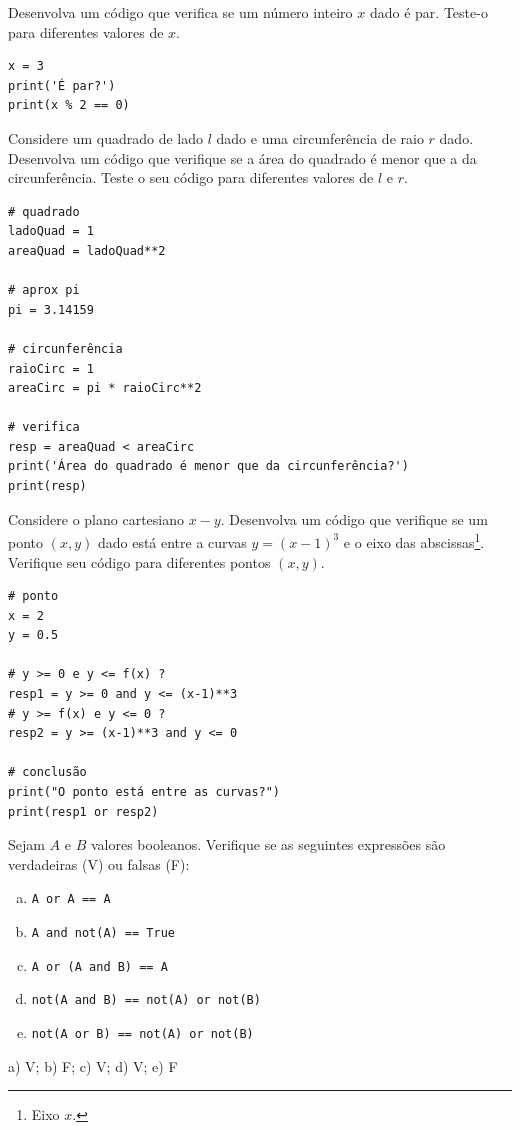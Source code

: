 \begin{exer}
  Desenvolva um código que verifica se um número inteiro $x$ dado é par. Teste-o para diferentes valores de $x$.
\end{exer}
\begin{resp}
\begin{lstlisting}
x = 3
print('É par?')
print(x % 2 == 0)
\end{lstlisting}
\end{resp}

\begin{exer}
  Considere um quadrado de lado $l$ dado e uma circunferência de raio $r$ dado. Desenvolva um código que verifique se a área do quadrado é menor que a da circunferência. Teste o seu código para diferentes valores de $l$ e $r$.
\end{exer}
\begin{resp}
\begin{lstlisting}
# quadrado
ladoQuad = 1
areaQuad = ladoQuad**2

# aprox pi
pi = 3.14159

# circunferência
raioCirc = 1
areaCirc = pi * raioCirc**2

# verifica
resp = areaQuad < areaCirc
print('Área do quadrado é menor que da circunferência?')
print(resp)
\end{lstlisting}
\end{resp}

\begin{exer}
  Considere o plano cartesiano $x-y$. Desenvolva um código que verifique se um ponto $(x, y)$ dado está entre a curvas $y = (x-1)^3$ e o eixo das abscissas\footnote{Eixo $x$.}. Verifique seu código para diferentes pontos $(x, y)$.
\end{exer}
\begin{resp}
\begin{lstlisting}
# ponto
x = 2
y = 0.5

# y >= 0 e y <= f(x) ?
resp1 = y >= 0 and y <= (x-1)**3
# y >= f(x) e y <= 0 ?
resp2 = y >= (x-1)**3 and y <= 0

# conclusão
print("O ponto está entre as curvas?")
print(resp1 or resp2)
\end{lstlisting}
\end{resp}

\begin{exer}
  Sejam $A$ e $B$ valores booleanos. Verifique se as seguintes expressões são verdadeiras (V) ou falsas (F):
  \begin{enumerate}[a)]
  \item \lstinline+A or A == A+
  \item \lstinline+A and not(A) == True+
  \item \lstinline+A or (A and B) == A+
  \item \lstinline+not(A and B) == not(A) or not(B)+
  \item \lstinline+not(A or B) == not(A) or not(B)+
  \end{enumerate}
\end{exer}
\begin{resp}
  a) V; b) F; c) V; d) V; e) F
\end{resp}

